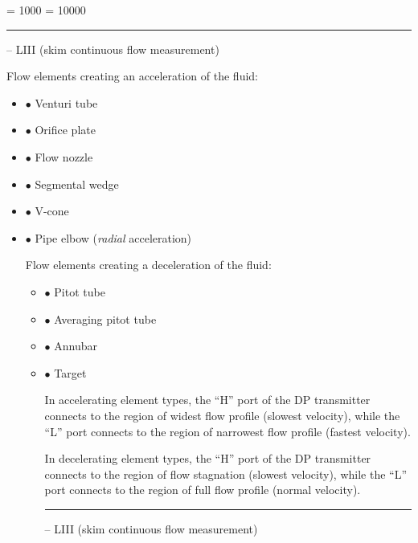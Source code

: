 



\tolerance = 1000
\pretolerance = 10000

\vskip 5pt \hrule \vskip 5pt  -- LIII (skim continuous flow measurement) \vskip 10pt

Flow elements creating an acceleration of the fluid:

\begin{itemize}
\item{$\bullet$} Venturi tube
\item{$\bullet$} Orifice plate
\item{$\bullet$} Flow nozzle
\item{$\bullet$} Segmental wedge
\item{$\bullet$} V-cone
\item{$\bullet$} Pipe elbow ({\it radial} acceleration)
\medskip

\vskip 10pt

Flow elements creating a deceleration of the fluid:

\begin{itemize}
\item{$\bullet$} Pitot tube
\item{$\bullet$} Averaging pitot tube
\item{$\bullet$} Annubar
\item{$\bullet$} Target
\medskip

\vskip 10pt

In accelerating element types, the ``H'' port of the DP transmitter connects to the region of widest flow profile (slowest velocity), while the ``L'' port connects to the region of narrowest flow profile (fastest velocity).

\vskip 10pt

In decelerating element types, the ``H'' port of the DP transmitter connects to the region of flow stagnation (slowest velocity), while the ``L'' port connects to the region of full flow profile (normal velocity).



\vskip 5pt \hrule \vskip 5pt  -- LIII (skim continuous flow measurement) \vskip 10pt


\end{itemize}
\end{itemize}
